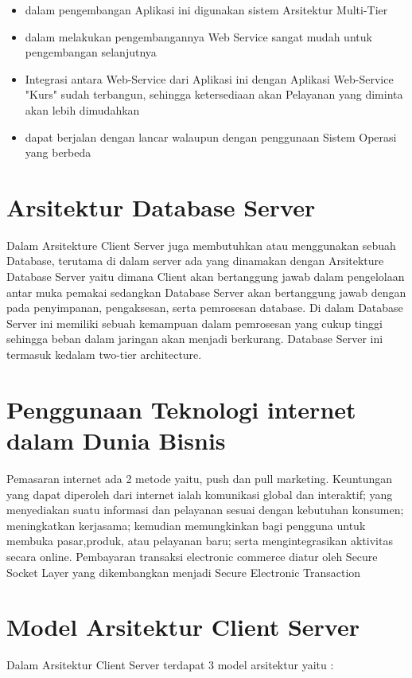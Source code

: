 {\begin{itemize}
    \item dalam pengembangan Aplikasi ini digunakan sistem Arsitektur Multi-Tier
    \item dalam melakukan pengembangannya Web Service sangat mudah untuk pengembangan selanjutnya
    \item Integrasi antara Web-Service dari Aplikasi ini dengan Aplikasi Web-Service "Kurs" sudah terbangun, sehingga ketersediaan akan Pelayanan yang
    diminta akan lebih dimudahkan
    \item dapat berjalan dengan lancar walaupun dengan penggunaan Sistem Operasi yang berbeda
\end{itemize}

\section{Arsitektur Database Server}
Dalam Arsitekture Client Server juga membutuhkan atau menggunakan sebuah Database, terutama di dalam server ada yang
dinamakan dengan Arsitekture Database Server yaitu dimana Client akan bertanggung jawab dalam pengelolaan antar muka pemakai
sedangkan Database Server akan bertanggung jawab dengan pada penyimpanan, pengaksesan, serta pemrosesan database.
Di dalam Database Server ini memiliki sebuah kemampuan dalam pemrosesan yang cukup tinggi sehingga beban dalam jaringan akan 
menjadi berkurang. Database Server ini termasuk kedalam two-tier architecture.

\section {Penggunaan Teknologi internet dalam Dunia Bisnis}
Pemasaran internet ada 2 metode yaitu, push dan pull marketing. Keuntungan yang dapat diperoleh dari internet ialah komunikasi global dan interaktif; yang menyediakan suatu informasi dan pelayanan sesuai dengan kebutuhan konsumen; meningkatkan kerjasama; kemudian memungkinkan bagi pengguna untuk membuka pasar,produk, atau pelayanan baru; serta mengintegrasikan aktivitas secara online. 
Pembayaran transaksi electronic commerce diatur oleh Secure Socket Layer yang dikembangkan menjadi Secure Electronic Transaction

\section{Model Arsitektur Client Server}
Dalam Arsitektur Client Server terdapat 3 model arsitektur yaitu :

}
